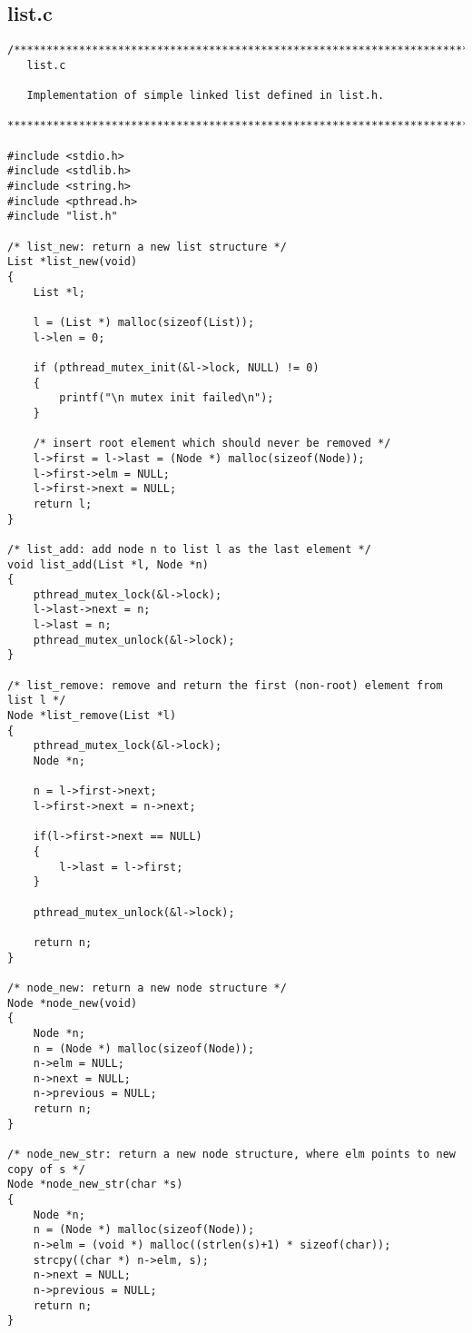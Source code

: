\subsection{list.c}
\begin{lstlisting}
/******************************************************************************
   list.c

   Implementation of simple linked list defined in list.h.

******************************************************************************/

#include <stdio.h>
#include <stdlib.h>
#include <string.h>
#include <pthread.h>
#include "list.h"

/* list_new: return a new list structure */
List *list_new(void)
{
	List *l;

	l = (List *) malloc(sizeof(List));
	l->len = 0;

	if (pthread_mutex_init(&l->lock, NULL) != 0)
    {
        printf("\n mutex init failed\n");
    }
	
	/* insert root element which should never be removed */
	l->first = l->last = (Node *) malloc(sizeof(Node));
	l->first->elm = NULL;
	l->first->next = NULL;
	return l;
}

/* list_add: add node n to list l as the last element */
void list_add(List *l, Node *n)
{
	pthread_mutex_lock(&l->lock);
	l->last->next = n;
	l->last = n;
	pthread_mutex_unlock(&l->lock);
}

/* list_remove: remove and return the first (non-root) element from list l */
Node *list_remove(List *l)
{
	pthread_mutex_lock(&l->lock);
	Node *n;
	
	n = l->first->next;
	l->first->next = n->next;
	
	if(l->first->next == NULL)
	{
		l->last = l->first;
	}

	pthread_mutex_unlock(&l->lock);
	
	return n;
}

/* node_new: return a new node structure */
Node *node_new(void)
{
	Node *n;
	n = (Node *) malloc(sizeof(Node));
	n->elm = NULL;
	n->next = NULL;
	n->previous = NULL;
	return n;
}

/* node_new_str: return a new node structure, where elm points to new copy of s */
Node *node_new_str(char *s)
{
	Node *n;
	n = (Node *) malloc(sizeof(Node));
	n->elm = (void *) malloc((strlen(s)+1) * sizeof(char));
	strcpy((char *) n->elm, s);
	n->next = NULL;
	n->previous = NULL;
	return n;
}

\end{lstlisting}